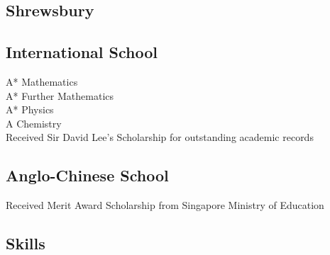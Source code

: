 \documentclass[a4paper]{deedy-resume-openfont}
\begin{document}
\begin{minipage}[t]{0.33\textwidth}
\sectionsep

\vskip 0.4cm
\subsection{Shrewsbury} 
\subsection {International School}
\hspace{0.6cm} A* Mathematics \\
\hspace{0.6cm} A* Further Mathematics \\
\hspace{0.6cm} A* Physics \\
\hspace{0.6cm} A  Chemistry \\
\vskip 0.2cm
Received Sir David Lee's Scholarship for outstanding academic records
\sectionsep

\vskip 0.4cm
\subsection{Anglo-Chinese School}
Received Merit Award Scholarship from Singapore Ministry of Education

\sectionsep


\vskip 0.5cm
\begin{snugshade}
\section{Skills}
\end{snugshade}

\end{minipage}
\end{document}
